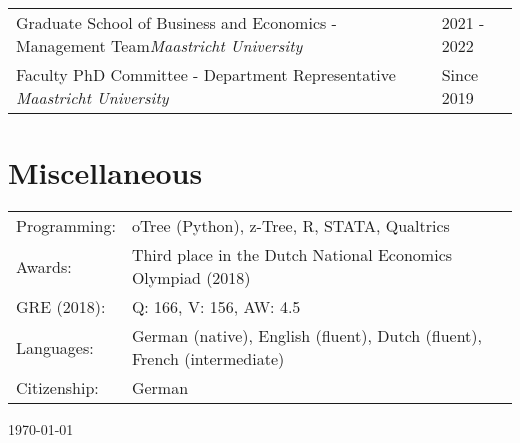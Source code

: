 \documentclass[11pt]{article}
\begin{document}
\noindent\begin{tabular}{L{14cm}L{3cm}}
	\rule{0pt}{4ex}Graduate School of Business and Economics - Management Team\newline \textit{Maastricht University} & 2021 - 2022   \\
	\rule{0pt}{4ex}Faculty PhD Committee - Department Representative \newline \textit{Maastricht University}  & Since 2019 
\end{tabular}


\section{Miscellaneous}
\noindent\begin{tabular}{L{3cm}L{13cm}}
Programming: & oTree (Python), z-Tree, R, STATA, Qualtrics \\
\rule{0pt}{3ex}Awards: & Third place in the Dutch National Economics Olympiad (2018) \\
\rule{0pt}{3ex}GRE (2018): & Q: 166, V: 156, AW: 4.5 \\
\rule{0pt}{3ex}Languages: & German (native), English (fluent), Dutch (fluent), French (intermediate) \\
\rule{0pt}{3ex}Citizenship: & German
\end{tabular}

\vspace*{1cm}

\hspace*{\fill} \monthyeardate\today
\end{document}
